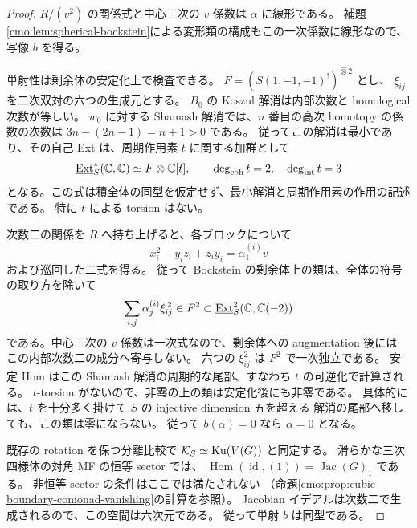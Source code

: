 \begin{proof}
$R/(v^2)$ の関係式と中心三次の $v$ 係数は $\alpha$ に線形である。
補題\ref{cmo:lem:spherical-bockstein}による変形類の構成もこの一次係数に線形なので、
写像 $b$ を得る。

単射性は剰余体の安定化上で検査できる。
$F=(S(1,-1,-1)^!)^{\widehat\otimes2}$ とし、
$\xi_{ij}$ を二次双対の六つの生成元とする。
$B_0$ の Koszul 解消は内部次数と homological 次数が等しい。
$w_0$ に対する Shamash 解消では、$n$ 番目の高次 homotopy の係数の次数は
$3n-(2n-1)=n+1>0$ である。
従ってこの解消は最小であり、その自己 Ext は、周期作用素 $t$ に関する加群として
\[
 \underline{\operatorname{Ext}}^*_S(\mathbb C,\mathbb C)
       \simeq F\otimes\mathbb C[t],\qquad
       \deg_{\mathrm{coh}}t=2,\quad \deg_{\mathrm{int}}t=3
\]
となる。この式は積全体の同型を仮定せず、最小解消と周期作用素の作用の記述である。
特に $t$ による torsion はない。

次数二の関係を $R$ へ持ち上げると、各ブロックについて
\[
 x_i^2-y_iz_i+z_iy_i=\alpha^{(i)}_1v
\]
および巡回した二式を得る。
従って Bockstein の剰余体上の類は、全体の符号の取り方を除いて
\begin{equation}\label{cmo:eq:boundary-bockstein-dual-class}
 \sum_{i,j}\alpha_j^{(i)}\xi_{ij}^{\,2}
 \in F^2\subset
 \underline{\operatorname{Ext}}^2_S(\mathbb C,\mathbb C(-2))
\end{equation}
である。中心三次の $v$ 係数は一次式なので、剰余体への augmentation 後には
この内部次数二の成分へ寄与しない。
六つの $\xi_{ij}^2$ は $F^2$ で一次独立である。
安定 Hom はこの Shamash 解消の周期的な尾部、すなわち $t$ の可逆化で計算される。
$t$-torsion がないので、非零の上の類は安定化後にも非零である。
具体的には、$t$ を十分多く掛けて $S$ の injective dimension 五を超える
解消の尾部へ移しても、この類は零にならない。
従って $b(\alpha)=0$ なら $\alpha=0$ となる。

既存の rotation を保つ分離比較で
$\mathcal K_S\simeq\operatorname{Ku}(V(G))$ と同定する。
滑らかな三次四様体の対角 MF の恒等 sector では、
$\operatorname{Hom}(\operatorname{id},(1))=\operatorname{Jac}(G)_1$ である。
非恒等 sector の条件はここでは満たされない
（命題\ref{cmo:prop:cubic-boundary-comonad-vanishing}の計算を参照）。
Jacobian イデアルは次数二で生成されるので、この空間は六次元である。
従って単射 $b$ は同型である。
\end{proof}

